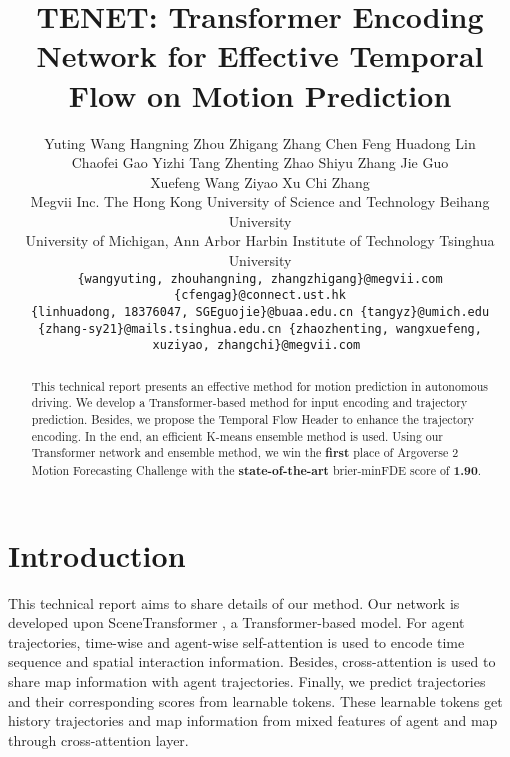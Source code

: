 \documentclass[10pt,twocolumn,letterpaper]{article}
\begin{document}
\title{TENET: Transformer Encoding Network for Effective Temporal Flow on Motion Prediction}
\author{Yuting Wang\footnotemark[1]\; \;Hangning Zhou\footnotemark[1]\; \;Zhigang Zhang\footnotemark[1]\; \;Chen Feng\; \;Huadong Lin\; \\ \;Chaofei Gao\; \;Yizhi Tang\; \;Zhenting Zhao\; \;Shiyu Zhang\; \;Jie Guo\; \\ \;Xuefeng Wang\; \;Ziyao Xu\; \;Chi Zhang\\
Megvii Inc. The Hong Kong University of Science and Technology Beihang University \\University of Michigan, Ann Arbor Harbin Institute of Technology Tsinghua University\\ 
\tt\small \{wangyuting, zhouhangning, zhangzhigang\}@megvii.com \{cfengag\}@connect.ust.hk \\ \tt\small \{linhuadong, 18376047, SGEguojie\}@buaa.edu.cn \{tangyz\}@umich.edu \\ \tt\small  \{zhang-sy21\}@mails.tsinghua.edu.cn \{zhaozhenting, wangxuefeng, xuziyao, zhangchi\}@megvii.com
}

\maketitle
\renewcommand{\thefootnote}{\fnsymbol{footnote}} 

\begin{abstract}
   This technical report presents an effective method for motion prediction in autonomous driving. We develop a Transformer-based method for input encoding and trajectory prediction. Besides, we propose the Temporal Flow Header to enhance the trajectory encoding. In the end, an efficient K-means ensemble method is used. Using our Transformer network and ensemble method, we win the \textbf{first} place of Argoverse 2 Motion Forecasting Challenge with the \textbf{state-of-the-art} brier-minFDE score of \textbf{1.90}.
\end{abstract}

\section{Introduction}
\label{sec:intro}
This technical report aims to share details of our method. Our network is developed upon SceneTransformer \cite{ngiam2021scene}, a Transformer-based \cite{xiong2020layer} model. For agent trajectories, time-wise and agent-wise self-attention is used to encode time sequence and spatial interaction information. Besides, cross-attention is used to share map information with agent trajectories. Finally, we predict  trajectories and their corresponding scores from  learnable tokens. These learnable tokens get history trajectories and map information from mixed features of agent and map through cross-attention layer.
\end{document}
